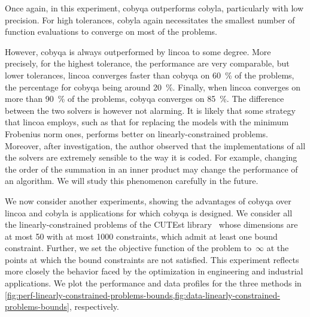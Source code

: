 Once again, in this experiment, \gls{cobyqa} outperforms \gls{cobyla}, particularly with low precision.
For high tolerances, \gls{cobyla} again necessitates the smallest number of function evaluations to converge on most of the problems.

However, \gls{cobyqa} is always outperformed by \gls{lincoa} to some degree.
More precisely, for the highest tolerance, the performance are very comparable, but lower tolerances, \gls{lincoa} converges faster than \gls{cobyqa} on \SI{60}{\percent} of the problems, the percentage for \gls{cobyqa} being around \SI{20}{\percent}.
Finally, when \gls{lincoa} converges on more than \SI{90}{\percent} of the problems, \gls{cobyqa} converges on \SI{85}{\percent}.
The difference between the two solvers is however not alarming.
It is likely that some strategy that \gls{lincoa} employs, such as that for replacing the models with the minimum Frobenius norm ones, performs better on linearly-constrained problems.
Moreover, after investigation, the author observed that the implementations of all the solvers are extremely sensible to the way it is coded.
For example, changing the order of the summation in an inner product may change the performance of an algorithm.
We will study this phenomenon carefully in the future.

We now consider another experiments, showing the advantages of \gls{cobyqa} over \gls{lincoa} and \gls{cobyla} is applications for which \gls{cobyqa} is designed.
We consider all the linearly-constrained problems of the CUTEst library~\cite{Gould_Orban_Toint_2015} whose dimensions are at most \num{50} with at most \num[group-minimum-digits=4]{1000} constraints, which admit at least one bound constraint.
Further, we set the objective function of the problem to~$\infty$ at the points at which the bound constraints are not satisfied.
This experiment reflects more closely the behavior faced by the optimization in engineering and industrial applications.
We plot the performance and data profiles for the three methods in \cref{fig:perf-linearly-constrained-problems-bounds,fig:data-linearly-constrained-problems-bounds}, respectively.

